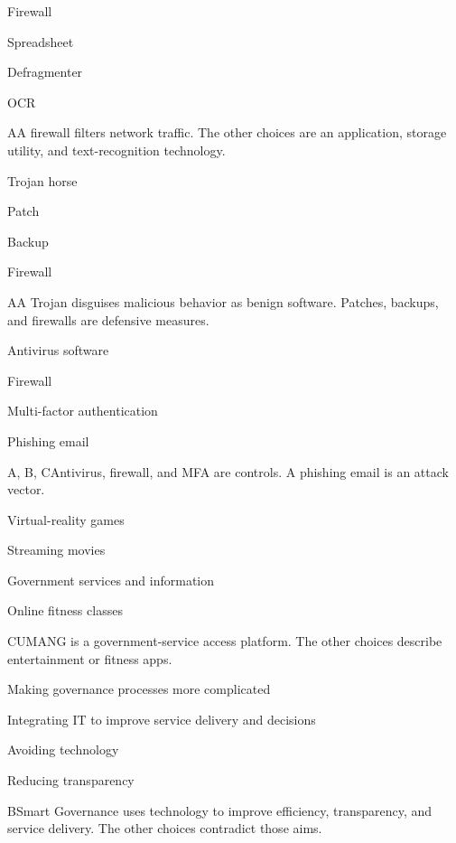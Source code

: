 \begin{enumerate}[label=\textbf{Q\arabic*.}, leftmargin=*]
  {\item Firewall
   \item Spreadsheet
   \item Defragmenter
   \item OCR}
  {A}{A firewall filters network traffic. The other choices are an application, storage utility, and text-recognition technology.}
  {\item Trojan horse
   \item Patch
   \item Backup
   \item Firewall}
  {A}{A Trojan disguises malicious behavior as benign software. Patches, backups, and firewalls are defensive measures.}
  {\item Antivirus software
   \item Firewall
   \item Multi-factor authentication
   \item Phishing email}
  {A, B, C}{Antivirus, firewall, and MFA are controls. A phishing email is an attack vector.}
\fi
\ifnum{}
  {\item Virtual-reality games
   \item Streaming movies
   \item Government services and information
   \item Online fitness classes}
  {C}{UMANG is a government-service access platform. The other choices describe entertainment or fitness apps.}
  {\item Making governance processes more complicated
   \item Integrating IT to improve service delivery and decisions
   \item Avoiding technology
   \item Reducing transparency}
  {B}{Smart Governance uses technology to improve efficiency, transparency, and service delivery. The other choices contradict those aims.}

\end{enumerate}
